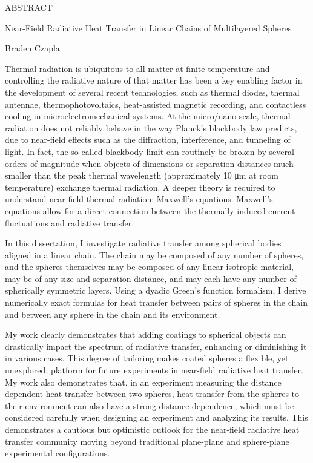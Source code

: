 
\thispagestyle{empty} %
\begin{center}
ABSTRACT

Near-Field Radiative Heat Transfer in Linear Chains of Multilayered Spheres

Braden Czapla
\end{center}

Thermal radiation is ubiquitous to all matter at finite temperature and controlling the radiative nature of that matter has been a key enabling factor in the development of several recent technologies, such as thermal diodes, thermal antennae, thermophotovoltaics, heat-assisted magnetic recording, and contactless cooling in microelectromechanical systems. At the micro/nano-scale, thermal radiation does not reliably behave in the way Planck's blackbody law predicts, due to near-field effects such as the diffraction, interference, and tunneling of light. In fact, the so-called blackbody limit can routinely be broken by several orders of magnitude when objects of dimensions or separation distances much smaller than the peak thermal wavelength (approximately 10 \si{\micro\meter} at room temperature) exchange thermal radiation. A deeper theory is required to understand near-field thermal radiation: Maxwell's equations. Maxwell's equations allow for a direct connection between the thermally induced current fluctuations and radiative transfer. 

In this dissertation, I investigate radiative transfer among spherical bodies aligned in a linear chain. The chain may be composed of any number of spheres, and the spheres themselves may be composed of any linear isotropic material, may be of any size and separation distance, and may each have any number of spherically symmetric layers. Using a dyadic Green's function formalism, I derive numerically exact formulas for heat transfer between pairs of spheres in the chain and between any sphere in the chain and its environment.

My work clearly demonstrates that adding coatings to spherical objects can drastically impact the spectrum of radiative transfer, enhancing or diminishing it in various cases. This degree of tailoring makes coated spheres a flexible, yet unexplored, platform for future experiments in near-field radiative heat transfer. My work also demonstrates that, in an experiment measuring the distance dependent heat transfer between two spheres, heat transfer from the spheres to their environment can also have a strong distance dependence, which must be considered carefully when designing an experiment and analyzing its results. This demonstrates a cautious but optimistic outlook for the near-field radiative heat transfer community moving beyond traditional plane-plane and sphere-plane experimental configurations. 